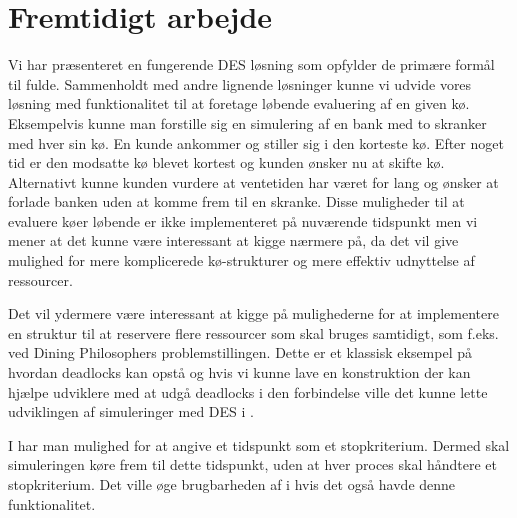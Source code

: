 \section{Fremtidigt arbejde}
Vi har præsenteret en fungerende DES løsning som opfylder de primære formål til fulde. Sammenholdt med andre lignende løsninger kunne vi udvide vores løsning med funktionalitet til at foretage løbende evaluering af en given kø. Eksempelvis kunne man forstille sig en simulering af en bank med to skranker med hver sin kø. En kunde ankommer og stiller sig i den korteste kø. Efter noget tid er den modsatte kø blevet kortest og kunden ønsker nu at skifte kø. Alternativt kunne kunden vurdere at ventetiden har været for lang og ønsker at forlade banken uden at komme frem til en skranke. Disse muligheder til at evaluere køer løbende er ikke implementeret på nuværende tidspunkt men vi mener at det kunne være interessant at kigge nærmere på, da det vil give mulighed for mere komplicerede kø-strukturer og mere effektiv udnyttelse af ressourcer.

Det vil ydermere være interessant at kigge på mulighederne for at implementere en struktur til at reservere flere ressourcer som skal bruges samtidigt, som f.eks. ved Dining Philosophers problemstillingen. Dette er et klassisk eksempel på hvordan deadlocks kan opstå og hvis vi kunne lave en konstruktion der kan hjælpe udviklere med at udgå deadlocks i den forbindelse ville det kunne lette udviklingen af simuleringer med DES i \pycsp. 

I \simpy har man mulighed for at angive et tidspunkt som et stopkriterium. Dermed skal  simuleringen køre frem til dette tidspunkt, uden at hver proces skal håndtere et stopkriterium. Det ville øge brugbarheden af \des i \pycsp hvis det også havde denne funktionalitet.
